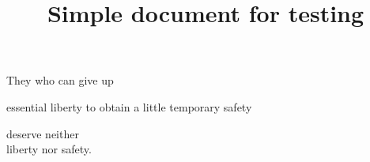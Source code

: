 \documentclass{article}
\title{Simple document for testing}
\date{}
\begin{document}
\maketitle
\newpage

They who can give up
\newpage

\parbox{1cm}{
essential liberty to obtain a little temporary safety
}
\newpage

\hspace{2cm} deserve neither\\
liberty nor safety.
\end{document}
